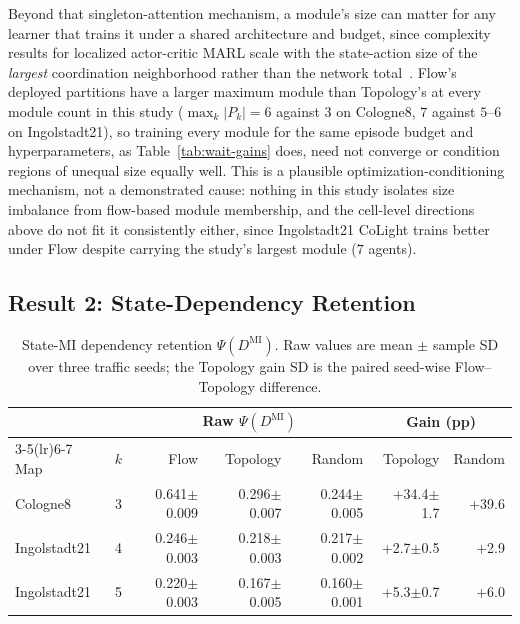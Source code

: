 \documentclass[journal]{IEEEtran}
\theoremstyle{definition}
\begin{document}
Beyond that singleton-attention mechanism, a module's size can matter for any learner that trains it under a shared architecture and budget, since complexity results for localized actor-critic MARL scale with the state-action size of the \emph{largest} coordination neighborhood rather than the network total~\citep{qu2022scalable}. Flow's deployed partitions have a larger maximum module than Topology's at every module count in this study ($\max_k|P_k|=6$ against $3$ on Cologne8, $7$ against $5$--$6$ on Ingolstadt21), so training every module for the same episode budget and hyperparameters, as Table~\ref{tab:wait-gains} does, need not converge or condition regions of unequal size equally well. This is a plausible optimization-conditioning mechanism, not a demonstrated cause: nothing in this study isolates size imbalance from flow-based module membership, and the cell-level directions above do not fit it consistently either, since Ingolstadt21 CoLight trains better under Flow despite carrying the study's largest module ($7$ agents).

\subsection{Result 2: State-Dependency Retention}
\label{sec:exp-psi-mi}

\begin{table}[t]
    \centering
    \caption{State-MI dependency retention $\Psi(D^{\mathrm{MI}})$. Raw values
        are mean $\pm$ sample SD over three traffic seeds; the Topology gain SD
        is the paired seed-wise Flow--Topology difference.}
    \label{tab:psi-mi}
    \scriptsize
    \setlength{\tabcolsep}{2.5pt}
    \begin{tabular}{lrrrrrr}
        \toprule
                     &     & \multicolumn{3}{c}{Raw $\Psi(D^{\mathrm{MI}})$} & \multicolumn{2}{c}{Gain (pp)}                                            \\
        \cmidrule(lr){3-5}\cmidrule(lr){6-7}
        Map          & $k$ & Flow                                            & Topology                      & Random          & Topology      & Random \\
        \midrule
        Cologne8     & 3   & 0.641$\pm$0.009                                 & 0.296$\pm$0.007               & 0.244$\pm$0.005 & +34.4$\pm$1.7 & +39.6  \\
        Ingolstadt21 & 4   & 0.246$\pm$0.003                                 & 0.218$\pm$0.003               & 0.217$\pm$0.002 & +2.7$\pm$0.5  & +2.9   \\
        Ingolstadt21 & 5   & 0.220$\pm$0.003                                 & 0.167$\pm$0.005               & 0.160$\pm$0.001 & +5.3$\pm$0.7  & +6.0   \\
        \bottomrule
    \end{tabular}
\end{table}
\end{document}
